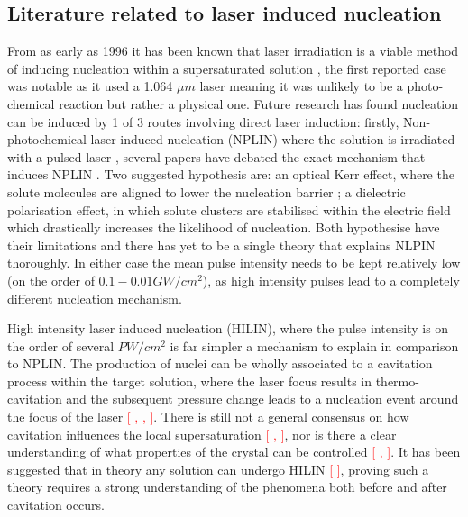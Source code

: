 \subsection{Literature related to laser induced nucleation}
From as early as 1996 it has been known that laser irradiation is a viable method of inducing nucleation within a supersaturated solution \cite{Garetz1996}, the first reported case was notable as it used a 1.064 $\mu m$ laser meaning it was unlikely to be a photo-chemical reaction but rather a physical one. Future research has found nucleation can be induced by 1 of 3 routes involving direct laser induction: firstly, Non-photochemical laser induced nucleation (NPLIN) where the solution is irradiated with a pulsed laser \cite{Garetz1996, Garetz2002,Sun2006}, several papers have debated the exact mechanism that induces NPLIN \cite{Garetz2002, Knott2011}. Two suggested hypothesis are: an optical Kerr effect, where the solute molecules are aligned to lower the nucleation barrier \cite{Knott2011}; a dielectric polarisation effect, in which solute clusters are stabilised within the electric field which drastically increases the likelihood of nucleation\cite{Alexander2008}. Both hypothesise have their limitations and there has yet to be a single theory that explains NLPIN thoroughly. In either case the mean pulse intensity needs to be kept relatively low (on the order of $0.1-0.01 GW/cm^2$), as high intensity pulses lead to a completely different nucleation mechanism.

High intensity laser induced nucleation (HILIN), where the pulse intensity is on the order of several $PW/cm^2$ is far simpler a mechanism to explain in comparison to NPLIN. The production of nuclei can be wholly associated to a cavitation process within the target solution, where the laser focus results in thermo-cavitation and the subsequent pressure change leads to a nucleation event around the focus of the laser \textcolor{red}{[ , , ]}. There is still not a general consensus on how cavitation influences the local supersaturation \textcolor{red}{[ , ]}, nor is there a clear understanding of what properties of the crystal can be controlled \textcolor{red}{[ , ]}. It has been suggested that in theory any solution can undergo HILIN \textcolor{red}{[ ]}, proving such a theory requires a strong understanding of the phenomena both before and after cavitation occurs.  

